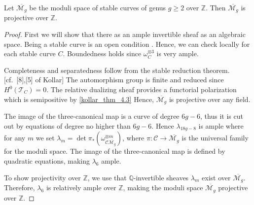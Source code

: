 \begin{lemma}
\label{theorem-mbgar-proj}
Let $\overline{\mathcal{M}_g}$ be the moduli space of stable curves of genus
$g\geq 2$ over $\mathbb{Z}$. Then $\overline{\mathcal{M}_g}$ is projective over
$\mathbb{Z}$.
\end{lemma}
\begin{proof}


First we will show that there as an ample invertible sheaf as an algebraic
space. Being a stable curve is an open condition .
Hence, we can check locally for each stable curve $C$.
Boundedness holds since $\omega_C^{\otimes 3}$ is very ample.


Completeness and separatedness follow from the stable reduction theorem.\cite[Tag 0E8C]{stacks-project} [cf.\ {[8],[5]  of Kollar}]  The automorphism group is finite and reduced since $H^0(\mathcal{T}_C)=0$.\cite[Tag 0E69]{stacks-project} The relative dualizing sheaf provides a functorial polarization which is semipositive by \ref{kollar_thm_4.3}  Hence, $\overline{\mathcal{M}_g}$ is projective over any field.

The image of the three-canonical map is a curve of degree $6g-6$, thus it is cut out by equations of degree no higher than $6g-6$. Hence $\lambda_{18g-8}$ is ample where for any $m$ we set $\lambda_m=\det \pi_*(\omega^{\otimes m}_{\mathcal{C}\overline{\mathcal{M}_g}})$, where $\pi:\mathcal{C}\to \overline{\mathcal{M}_g}$ is the universal family for the moduli space.  The image of the three-canonical map is defined by quadratic equations, making $\lambda_6$ ample.

To show projectivity over $\mathbb{Z}$, we use that $\mathbb{Q}$-invertible sheaves $\lambda_m$ exist over $\overline{\mathcal{M}_g}$. Therefore, $\lambda_6$ is relatively ample over $\mathbb{Z}$, making the moduli space $\overline{\mathcal{M}_g}$ projective over $\mathbb{Z}$.
\end{proof}




